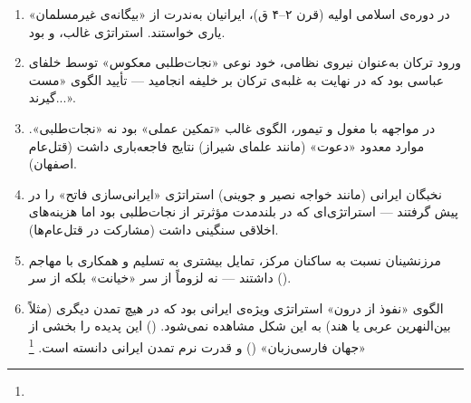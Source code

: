 \begin{tcolorbox}[wavebox, title={یافته‌های کلیدی فصل ۵}]
\begin{enumerate}[nosep, label=\textbf{\arabic*.}]
  \item در دوره‌ی اسلامی اولیه (قرن ۲–۴ ق)، ایرانیان به‌ندرت از «بیگانه‌ی غیرمسلمان» یاری خواستند. استراتژی غالب،  و  بود.

  \item ورود ترکان به‌عنوان نیروی نظامی، خود نوعی «نجات‌طلبی معکوس» توسط خلفای عباسی بود که در نهایت به غلبه‌ی ترکان بر خلیفه انجامید — تأیید الگوی «مست گیرند...».

  \item در مواجهه با مغول و تیمور، الگوی غالب «تمکین عملی» بود نه «نجات‌طلبی». موارد معدود «دعوت» (مانند علمای شیراز) نتایج فاجعه‌باری داشت (قتل‌عام اصفهان).

  \item نخبگان ایرانی (مانند خواجه نصیر و جوینی) استراتژی «ایرانی‌سازی فاتح» را در پیش گرفتند — استراتژی‌ای که در بلندمدت مؤثرتر از نجات‌طلبی بود اما هزینه‌های اخلاقی سنگینی داشت (مشارکت در قتل‌عام‌ها).

  \item مرزنشینان نسبت به ساکنان مرکز، تمایل بیشتری به تسلیم و همکاری با مهاجم داشتند — نه لزوماً از سر «خیانت» بلکه از سر  ().

  \item الگوی «نفوذ از درون» استراتژی ویژه‌ی ایرانی بود که در هیچ تمدن دیگری (مثلاً بین‌النهرین عربی یا هند) به این شکل مشاهده نمی‌شود.  () این پدیده را بخشی از «جهان فارسی‌زبان» () و قدرت نرم تمدن ایرانی دانسته است.%
  \footnote{}
\end{enumerate}
\end{tcolorbox}

\cleardoublepage